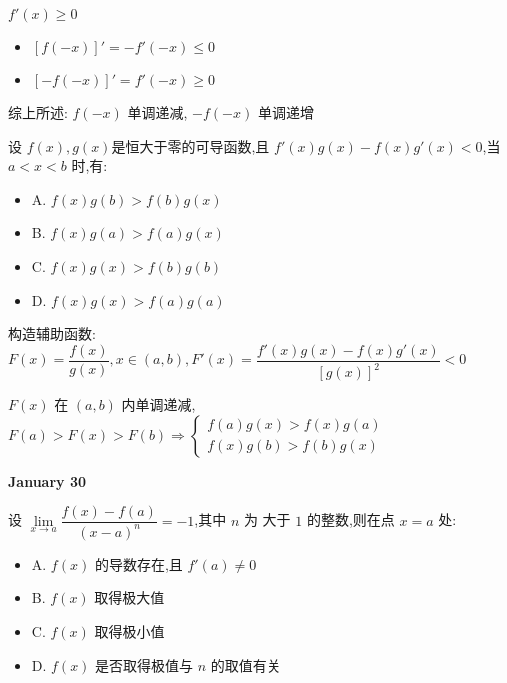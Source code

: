 \begin{solution}

	$f'(x)\geq 0$
	\begin{itemize}
		\item $[f(-x)]' = -f'(-x)\leq 0$
		\item $[-f(-x)]' = f'(-x)\geq 0$
	\end{itemize}

	综上所述: $f(-x)$ 单调递减, $-f(-x)$ 单调递增
\end{solution}

\begin{example}[][Exam: 27.4.16]
	设 $f(x),g(x)$是恒大于零的可导函数,且 $f'(x)g(x)-f(x)g'(x)<0$,当 $a<x<b$ 时,有:
\begin{itemize}
	\item A. $f(x)g(b)>f(b)g(x)$
	\item B. $f(x)g(a)>f(a)g(x)$
	\item C. $f(x)g(x)>f(b)g(b)$
	\item D. $f(x)g(x)>f(a)g(a)$
\end{itemize}
\end{example}

\begin{solution}

	构造辅助函数: $F(x) = \dfrac{f(x)}{g(x)}, x\in (a,b), F'(x) = \dfrac{f'(x)g(x)-f(x)g'(x)}{[g(x)]^{2}} < 0$

	$F(x)$ 在 $(a,b)$ 内单调递减, $F(a) > F(x) > F(b)\Rightarrow 
	\begin{cases}
		f(a)g(x) > f(x)g(a)\\
		f(x)g(b) > f(b)g(x)
	\end{cases}$
\end{solution}

\textcolor{purplea}{\textbf{January 30}}

\begin{example}[][Exam: 27.4.17]
	设 $\lim\limits_{x\to a}\dfrac{f(x)-f(a)}{(x-a)^{n}}=-1$,其中 $n$ 为 大于 $1$ 的整数,则在点 $x=a$ 处:
\begin{itemize}
	\item A. $f(x)$ 的导数存在,且 $f'(a)\neq 0$
	\item B. $f(x)$ 取得极大值
	\item C. $f(x)$ 取得极小值
	\item D. $f(x)$ 是否取得极值与 $n$ 的取值有关
\end{itemize}
\end{example}

